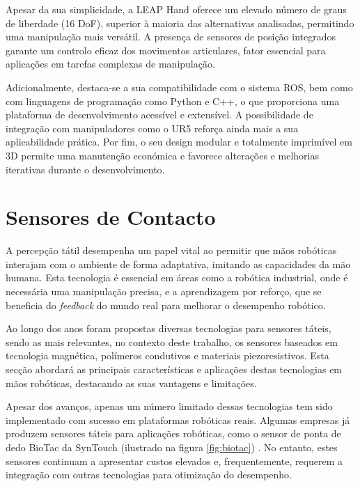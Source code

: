 Apesar da sua simplicidade, a LEAP Hand oferece um elevado número de graus de liberdade (16 DoF), superior à maioria das alternativas analisadas, permitindo uma manipulação mais versátil. A presença de sensores de posição integrados garante um controlo eficaz dos movimentos articulares, fator essencial para aplicações em tarefas complexas de manipulação.

Adicionalmente, destaca-se a sua compatibilidade com o sistema ROS, bem como com linguagens de programação como Python e C++, o que proporciona uma plataforma de desenvolvimento acessível e extensível. A possibilidade de integração com manipuladores como o UR5 reforça ainda mais a sua aplicabilidade prática. Por fim, o seu design modular e totalmente imprimível em 3D permite uma manutenção económica e favorece alterações e melhorias iterativas durante o desenvolvimento.



\section{Sensores de Contacto}

A percepção tátil desempenha um papel vital ao permitir que mãos robóticas interajam com o ambiente de forma adaptativa, imitando as capacidades da mão humana.
Esta tecnologia é essencial em áreas como a robótica industrial, onde é necessária uma manipulação precisa, e a aprendizagem por reforço, que se beneficia do \textit{feedback} do mundo real para melhorar o desempenho robótico.

Ao longo dos anos foram propostas diversas tecnologias para sensores táteis, sendo as mais relevantes, no contexto deste trabalho, os sensores baseados em tecnologia magnética, polímeros condutivos e materiais piezoresistivos. Esta secção abordará as principais características e aplicações destas tecnologias em mãos robóticas, destacando as suas vantagens e limitações.

Apesar dos avanços, apenas um número limitado dessas tecnologias tem sido implementado com sucesso em plataformas robóticas reais. Algumas empresas já produzem sensores táteis para aplicações robóticas, como o sensor de ponta de dedo BioTac da SynTouch (ilustrado na figura \ref{fig:biotac})  \cite{Biotac12}. No entanto, estes sensores continuam a apresentar custos elevados e, frequentemente, requerem a integração com outras tecnologias para otimização do desempenho.

